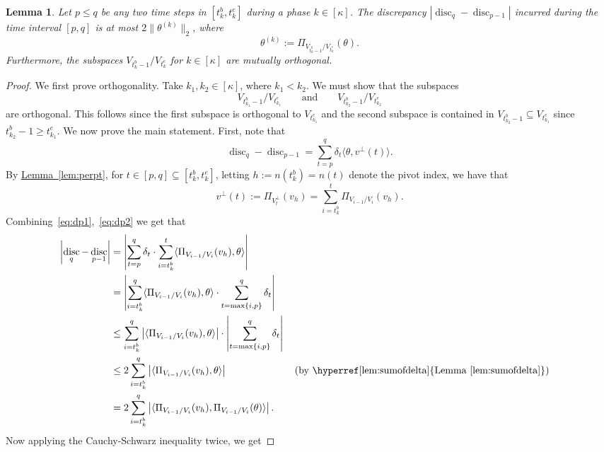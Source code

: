 \documentclass[11pt]{article}
\numberwithin{equation}{section}
\newtheorem{lemma}[theorem]{Lemma}
\theoremstyle{definition}
\theoremstyle{plain}
\newcommand{\expref}[2]{\hyperref[#2]{#1~\ref{#2}}}
\DeclareMathOperator{\disc}{disc}   %
\newcommand{\set}[1]{\left\{ #1 \right\}}
\newcommand{\ip}[2]{\langle #1, #2 \rangle}
\begin{document}
\begin{lemma}
\label{lem:discphase}
Let $p \le q$ be any two time steps in $[t^b_k, t^e_k]$ during a phase $k \in [\kappa]$.
The discrepancy
$|\disc_{q}-\disc_{p-1}|$ incurred during the time interval $[p,q]$ is
at most $2 \|\theta^{(k)}\|_2$, where
\[
  \theta^{(k)} := \Pi_{V_{t^b_k-1} / V_{t^e_k}}(\theta).
\]
Furthermore, the subspaces $V_{t^b_k-1} / V_{t^e_k}$ for
$k \in [\kappa]$ are mutually orthogonal.
\end{lemma}
\begin{proof}
We first prove orthogonality. Take $k_1,k_2 \in [\kappa]$, where $k_1 < k_2$. We
must show that the subspaces
\[
  V_{t^b_{k_1}-1} / V_{t^e_{k_1}}\qquad \text{and}\qquad V_{t^b_{k_2}-1} /
  V_{t^e_{k_2}}
\]
are orthogonal. This follows since the first subspace is orthogonal to
$V_{t^e_{k_1}}$ and the second subspace is contained in
$V_{t^b_{k_2}-1} \subseteq V_{t^e_{k_1}}$ since
$t^b_{k_2}-1 \geq t^e_{k_1}$. We now prove the main statement. First,
note that
\begin{equation}
\label{eq:dp1}
\disc_{q}-\disc_{p-1} = \sum_{t=p}^{q} \delta_t \ip{\theta}{v^\perp(t)}\text {.}
\end{equation}
By \expref{Lemma}{lem:perpt}, for $t \in [p,q] \subseteq
[t^b_k,t^e_k]$, letting $h := n(t^b_k) = n(t)$ denote the pivot index, we have that
\begin{equation}
\label{eq:dp2}
v^\perp(t) := \Pi_{V_t^\perp}(v_h) = \sum_{i=t^b_k}^{t} \Pi_{V_{i-1}/V_i}(v_h).
\end{equation}
Combining~\eqref{eq:dp1},~\eqref{eq:dp2} we get that
\begin{align}
\left|\disc_{q}-\disc_{p-1}\right| &= \left|\sum_{t=p}^{q} \delta_t \cdot
\sum_{i=t^b_k}^t \ip{\Pi_{V_{i-1}/V_i}(v_h)}{\theta}\right| \nonumber\\
   &= \left|\sum_{i=t^b_k}^{q} \ip{\Pi_{V_{i-1}/V_i}(v_h)}{\theta} \cdot \sum_{t= \max \set{i,p}}^{q} \delta_t
\right| \nonumber\\
   &\leq \sum_{i=t^b_k}^{q} \left|\ip{\Pi_{V_{i-1}/V_i}(v_h)}{\theta}\right| \cdot \left|\sum_{t= \max \set{i,p}}^{q} \delta_t\right| \nonumber
 \\
   &\leq  2 \sum_{i=t^b_k}^{q} \left|\ip{\Pi_{V_{i-1}/V_i}(v_h)}{\theta}\right| &&
\left(\text{by \expref{Lemma}{lem:sumofdelta}}\right)\nonumber \\
   &= 2 \sum_{i=t^b_k}^{q} \left|\ip{\Pi_{V_{i-1}/V_i}(v_h)}{\Pi_{V_{i-1}/V_i}(\theta)}\right|. \label{eq:dp3}
\end{align}
Now applying the Cauchy-Schwarz inequality twice, we get

\end{proof}
\end{document}

